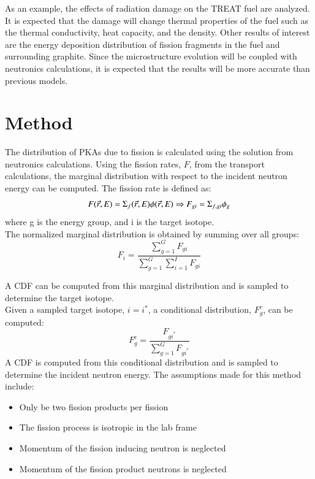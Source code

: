 \documentclass{anstrans}
\begin{document}
As an example, the effects of radiation damage on the TREAT fuel are analyzed. It is expected
that the damage will change thermal properties of the fuel such as the thermal
conductivity, heat capacity, and the density. Other results of interest are the
energy deposition distribution of fission fragments in the fuel and surrounding graphite.
Since the microstructure evolution will be coupled with neutronics calculations, it is
expected that the results will be more accurate than previous models.

\section{Method}

The distribution of PKAs due to fission is calculated using the solution
from neutronics calculations.
Using the fission rates, $F$, from the transport calculations, the marginal
distribution with respect to the incident neutron energy can be computed. The fission
rate is defined as:
\begin{equation}
  F(\vec{r},E) = \Sigma_{f}(\vec{r},E) \phi(\vec{r},E) \Rightarrow F_{gi} = \Sigma_{f,gi} \phi_{g}
\end{equation}
where g is the energy group, and i is the target isotope.\\
The normalized marginal distribution is obtained by summing over all groups:
\begin{equation}
  F_i = \frac{\sum_{g=1}^G F_{gi} }{\sum_{g=1}^G \sum_{i=1}^I F_{gi}}
\end{equation}

A CDF can be computed from this marginal distribution and is sampled to
determine the target isotope.\\

Given a sampled target isotope, $i = i^*$, a conditional distribution, $F_g^c$, can be computed:
\begin{equation}
  F_g^c = \frac{F_{gi^*}}{\sum_{g=1}^G F_{gi^*} }
\end{equation}
A CDF is computed from this conditional distribution and is sampled
to determine the incident neutron energy.
The assumptions made for this method include:
\begin{itemize}
  \item Only be two fission products per fission
  \item The fission process is isotropic in the lab frame
  \item Momentum of the fission inducing neutron is neglected
  \item Momentum of the fission product
  neutrons is neglected
\end{itemize}
\end{document}
